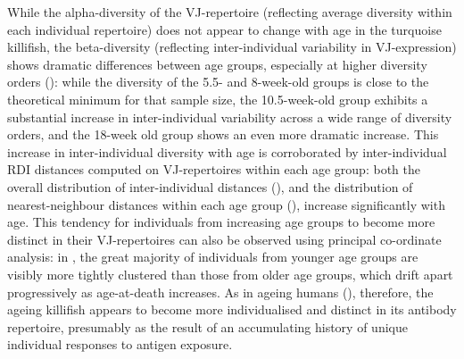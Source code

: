 While the alpha-diversity of the VJ-repertoire (reflecting average diversity within each individual repertoire) does not appear to change with age in the turquoise killifish, the beta-diversity (reflecting inter-individual variability in VJ-expression) shows dramatic differences between age groups, especially at higher diversity orders (): while the diversity of the 5.5- and 8-week-old groups is close to the theoretical minimum for that sample size, the 10.5-week-old group exhibits a substantial increase in inter-individual variability across a wide range of diversity orders, and the 18-week old group shows an even more dramatic increase. This increase in inter-individual diversity with age is corroborated by inter-individual RDI distances computed on VJ-repertoires within each age group: both the overall distribution of inter-individual distances (), and the distribution of nearest-neighbour distances within each age group (), increase significantly with age. This tendency for individuals from increasing age groups to become more distinct in their VJ-repertoires can also be observed using principal co-ordinate analysis:  in , the great majority of individuals from younger age groups are visibly more tightly clustered than those from older age groups, which drift apart progressively as age-at-death increases. As in ageing humans (), therefore, the ageing killifish appears to become more individualised and distinct in its antibody repertoire, presumably as the result of an accumulating history of unique individual responses to antigen exposure.

